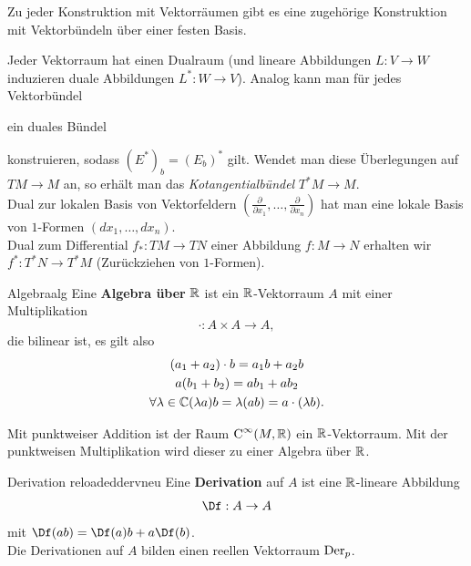 \begin{bemerkung}
Zu jeder Konstruktion mit Vektorräumen gibt es eine zugehörige Konstruktion mit Vektorbündeln über einer festen Basis.
\begin{beispiel}
Jeder Vektorraum hat einen Dualraum (und lineare Abbildungen $L: V \to W$ induzieren duale Abbildungen $L^\ast: W \to V$). Analog kann man für jedes Vektorbündel 
ein duales Bündel 
konstruieren, sodass $(E^\ast)_b = (E_b)^\ast$ gilt. Wendet man diese Überlegungen auf $TM \to M$ an, so erhält man das \textit{Kotangentialbündel} $T^\ast M \to M$.\\
 Dual zur lokalen Basis von Vektorfeldern $\left( \frac{\partial}{\partial x_1}, \dots, \frac{\partial}{\partial x_n}\right)$ hat man eine lokale Basis von $1$-Formen $\left( dx_1, \dots, dx_n \right)$.\\
Dual zum Differential $f_\ast: TM \to TN$ einer Abbildung $f: M \to N$ erhalten wir $f^\ast: T^\ast N \to T^\ast M$ (Zurückziehen von $1$-Formen).
\end{beispiel}
\end{bemerkung}
\begin{definition}{Algebra}{alg}
Eine \textbf{Algebra über} $\mathbb{R}$ ist ein $\mathbb{R}$-Vektorraum $A$ mit einer Multiplikation
\begin{equation}
\cdot: A \times A \to A,
\end{equation}
die bilinear ist, es gilt also
\begin{gather}
(a_1 + a_2) \cdot b = a_1b + a_2b \\
a(b_1+b_2) = ab_1 + ab_2\\
\forall \lambda \in \mathbb{C} (\lambda a)b = \lambda (ab) = a \cdot (\lambda b).
\end{gather}
\end{definition}
\begin{bemerkung}
Mit punktweiser Addition ist der Raum $\cinf{M}{\R}$ ein $\mathbb{R}$-Vektorraum. Mit der punktweisen Multiplikation wird dieser zu einer Algebra über $\mathbb{R}$.
\end{bemerkung}
\begin{definition}{Derivation reloaded}{dervneu}
Eine \textbf{Derivation} auf $A$ ist eine $\mathbb{R}$-lineare Abbildung
\begin{equation}
\Df: A \to A
\end{equation}
mit $\Df (ab) = \Df (a) b + a \Df (b)$.\\
Die Derivationen auf $A$ bilden einen reellen Vektorraum $\text{Der}_{p}$.
\end{definition}
